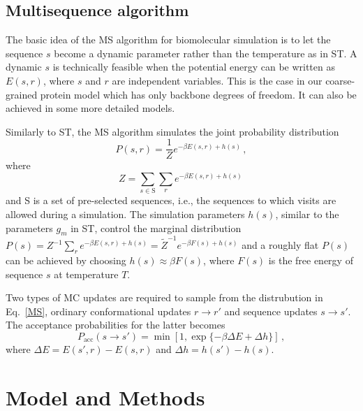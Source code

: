 \documentclass[
aip,
rsi,%
amsmath,amssymb,
reprint,%
]{revtex4-1}
\newcommand	 {\sbar}	{{s}}
\newcommand	 {\rbar}	{{r}}
\begin{document}
\subsection{Multisequence algorithm}
 
The basic idea of the MS algorithm for biomolecular simulation is to let the sequence $\sbar$ become a dynamic parameter rather than the temperature as in ST. A dynamic $\sbar$ is technically feasible when the potential energy can be written as $E(\sbar,\rbar)$, where $\sbar$ and $\rbar$ are independent variables. This is the case in our coarse-grained protein model which has only backbone degrees of freedom. It can also be achieved in some more detailed models.~\cite{Bhattacherjee2013,Wallin2017} 

Similarly to ST, the MS algorithm simulates the joint probability distribution
\begin{equation}
P(\sbar,\rbar) =\dfrac{1}{Z}e^{-\beta E(\sbar,\rbar) + h(\sbar)}\,, 
\label{MS}
\end{equation}
where  {\color{red}
\begin{equation}
Z = \sum_{\sbar\in\mathrm{S}}\sum_{\rbar} e^{-\beta E(\sbar,\rbar)+ h(\sbar)}\,
\label{eq:ZMS}
\end{equation}
and S is a set of pre-selected sequences, i.e., the sequences to which visits are allowed during a simulation.} The simulation parameters $h(\sbar)$, similar to the parameters $g_m$ in ST, control the marginal distribution $P(\sbar)=Z^{-1}\sum_{\rbar} e^{-\beta E(\sbar,\rbar)+ h(\sbar)} = \tilde{Z}^{-1}e^{-\beta F(\sbar)+ h(\sbar)}$ and a roughly flat $P(\sbar)$ can be achieved by choosing $h(\sbar) \approx \beta F(\sbar)$, where $F(\sbar)$ is the free energy of sequence $\sbar$ at temperature $T$. 

Two types of MC updates are required to sample from the distrubution in Eq.~\ref{MS}, ordinary conformational updates $\rbar\rightarrow\rbar'$ and {\color{red} sequence} updates $\sbar\rightarrow\sbar'$. The acceptance probabilities for the latter  becomes
\begin{equation}
P_\mathrm{acc} (\sbar\rightarrow\sbar') = \min [1, \exp\{-\beta\Delta E+\Delta h\}]\,,
\label{accrej}
\end{equation}
where $\Delta E = E(\sbar',\rbar)-E(\sbar,\rbar)$ and $\Delta h = h({\sbar'})-h(\sbar)$.

\section{Model and Methods}
\end{document}
